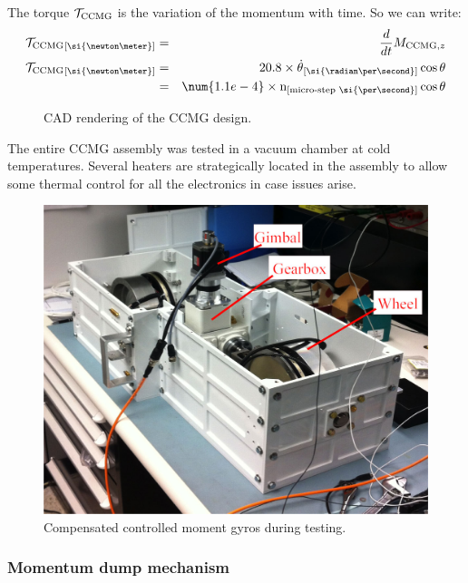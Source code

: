 The torque $\mathcal{T}_{\textrm{CCMG}}$ is the variation of the momentum with time. So we can write:
\begin{eqnarray}
\ccmgtorque\units{\si{\newton\meter}} &= &\frac{d}{dt}\MCCMGz\\
\ccmgtorque\units{\si{\newton\meter}} &= & 20.8\times \dot{\theta}\units{\si{\radian\per\second}} \cos\theta\\
 &= & \num{1.1e-4}\times \velstepper\units{micro-step~\si{\per\second}}\cos\theta
 \label{eq:CCMGTorque}
\end{eqnarray}

\begin{figure}[!ht]
	\centering
	
	\caption[CCMG schematics]{CAD rendering of the CCMG design.}
	\label{fig:CCMGnocase}
    \end{figure}

The entire CCMG assembly was tested in a vacuum chamber at cold temperatures. Several heaters are strategically located in the assembly to allow some thermal control for all the electronics in case issues arise.

\begin{figure}[!ht]
	\centering
	\includegraphics[width=\textwidth]{Figures/CCMG_annotated.jpg} 
	\caption[CCMG testing]{Compensated controlled moment gyros during testing.}
	\label{fig:BETTIICCMG}
    \end{figure}


\subsubsection{Momentum dump mechanism}
\label{subsec:chap3momdumpmotor}

